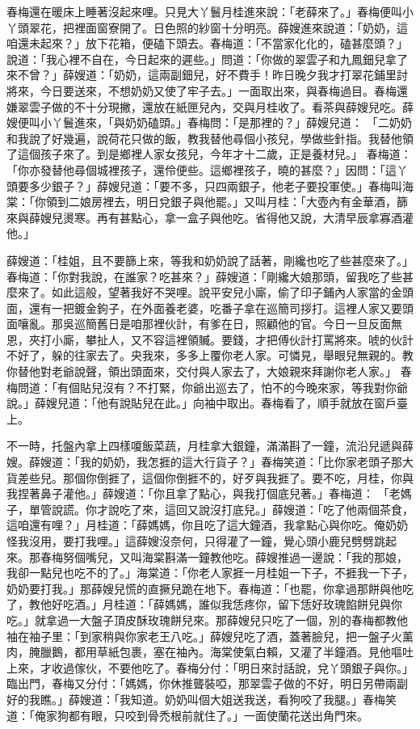 春梅還在暖床上睡著沒起來哩。只見大丫鬟月桂進來說：「老薛來了。」春梅便叫小丫頭翠花，把裡面窗寮開了。日色照的紗窗十分明亮。薛嫂進來說道：「奶奶，這咱還未起來？」放下花箱，便磕下頭去。春梅道：「不當家化化的，磕甚麼頭？」說道：「我心裡不自在，今日起來的遲些。」問道：「你做的翠雲子和九鳳鈿兒拿了來不曾？」薛嫂道：「奶奶，這兩副鈿兒，好不費手！昨日晚夕我才打翠花鋪里討將來，今日要送來，不想奶奶又使了牢子去。」一面取出來，與春梅過目。春梅還嫌翠雲子做的不十分現撇，還放在紙匣兒內，交與月桂收了。看茶與薛嫂兒吃。薛嫂便叫小丫鬟進來，「與奶奶磕頭。」春梅問：「是那裡的？」薛嫂兒道： 「二奶奶和我說了好幾遍，說荷花只做的飯，教我替他尋個小孩兒，學做些針指。我替他領了這個孩子來了。到是鄉裡人家女孩兒，今年才十二歲，正是養材兒。」 春梅道：「你亦發替他尋個城裡孩子，還伶便些。這鄉裡孩子，曉的甚麼？」因問：「這丫頭要多少銀子？」薛嫂兒道：「要不多，只四兩銀子，他老子要投軍使。」春梅叫海棠：「你領到二娘房裡去，明日兌銀子與他罷。」又叫月桂：「大壺內有金華酒，篩來與薛嫂兒燙寒。再有甚點心，拿一盒子與他吃。省得他又說，大清早辰拿寡酒灌他。」

薛嫂道：「桂姐，且不要篩上來，等我和奶奶說了話著，剛纔也吃了些甚麼來了。」春梅道：「你對我說，在誰家？吃甚來？」薛嫂道：「剛纔大娘那頭，留我吃了些甚麼來了。如此這般，望著我好不哭哩。說平安兒小廝，偷了印子鋪內人家當的金頭面，還有一把鍍金鉤子，在外面養老婆，吃番子拿在巡簡司拶打。這裡人家又要頭面嚷亂。那吳巡簡舊日是咱那裡伙計，有爹在日，照顧他的官。今日一旦反面無恩，夾打小廝，攀扯人，又不容這裡領贓。要錢，才把傅伙計打罵將來。唬的伙計不好了，躲的往家去了。央我來，多多上覆你老人家。可憐見，舉眼兒無親的。教你替他對老爺說聲，領出頭面來，交付與人家去了，大娘親來拜謝你老人家。」 春梅問道：「有個貼兒沒有？不打緊，你爺出巡去了，怕不的今晚來家，等我對你爺說。」薛嫂兒道：「他有說貼兒在此。」向袖中取出。春梅看了，順手就放在窗戶臺上。

不一時，托盤內拿上四樣嗄飯菜蔬，月桂拿大銀鐘，滿滿斟了一鐘，流沿兒遞與薛嫂。薛嫂道：「我的奶奶，我怎捱的這大行貨子？」春梅笑道：「比你家老頭子那大貨差些兒。那個你倒捱了，這個你倒捱不的，好歹與我捱了。要不吃，月桂，你與我捏著鼻子灌他。」薛嫂道：「你且拿了點心，與我打個底兒著。」春梅道： 「老媽子，單管說謊。你才說吃了來，這回又說沒打底兒。」薛嫂道：「吃了他兩個茶食，這咱還有哩？」月桂道：「薛媽媽，你且吃了這大鐘酒，我拿點心與你吃。俺奶奶怪我沒用，要打我哩。」這薛嫂沒奈何，只得灌了一鐘，覺心頭小鹿兒劈劈跳起來。那春梅努個嘴兒，又叫海棠斟滿一鐘教他吃。薛嫂推過一邊說：「我的那娘，我卻一點兒也吃不的了。」海棠道：「你老人家捱一月桂姐一下子，不捱我一下子，奶奶要打我。」那薛嫂兒慌的直撅兒跪在地下。春梅道：「也罷，你拿過那餅與他吃了，教他好吃酒。」月桂道：「薛媽媽，誰似我恁疼你，留下恁好玫瑰餡餅兒與你吃。」就拿過一大盤子頂皮酥玫瑰餅兒來。那薛嫂兒只吃了一個，別的春梅都教他袖在袖子里：「到家稍與你家老王八吃。」薛嫂兒吃了酒，蓋著臉兒，把一盤子火薰肉，腌臘鵝，都用草紙包裹，塞在袖內。海棠使氣白賴，又灌了半鐘酒。見他嘔吐上來，才收過傢伙，不要他吃了。春梅分付：「明日來討話說，兌丫頭銀子與你。」臨出門，春梅又分付：「媽媽，你休推聾裝啞，那翠雲子做的不好，明日另帶兩副好的我瞧。」薛嫂道：「我知道。奶奶叫個大姐送我送，看狗咬了我腿。」春梅笑道：「俺家狗都有眼，只咬到骨禿根前就住了。」一面使蘭花送出角門來。

